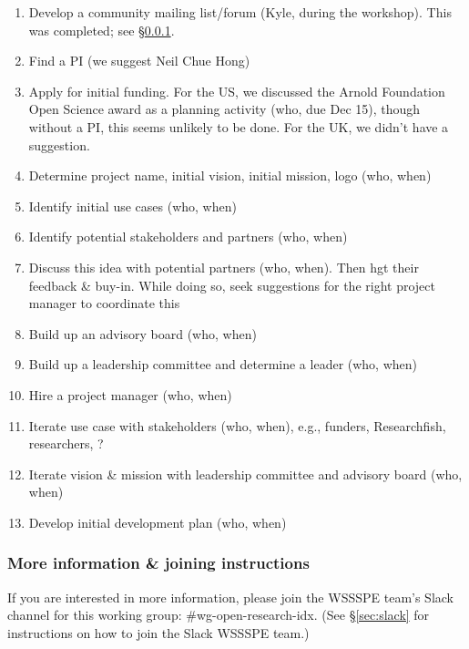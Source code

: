 \begin{enumerate}
\item Develop a community mailing list/forum (Kyle, during the workshop).  This was completed; see \S\ref{sec:wg-open-research-index-list}.

\item Find a PI (we suggest Neil Chue Hong)

\item Apply for initial funding. For the US, we discussed the Arnold Foundation Open Science award as a planning activity (who, due Dec 15), though without a PI, this seems unlikely to be done.
For the UK, we didn't have a suggestion.

\item Determine project name, initial vision, initial mission, logo (who, when)

\item Identify initial use cases (who, when)

\item Identify potential stakeholders and partners (who, when)

\item Discuss this idea with potential partners (who, when).
Then hgt their feedback \& buy-in.
While doing so, seek suggestions for the right project manager to coordinate this

\item Build up an advisory board (who, when)

\item Build up a leadership committee and determine a leader (who, when)

\item Hire a project manager (who, when)

\item Iterate use case with stakeholders (who, when),
e.g., funders, Researchfish, researchers, ?

\item Iterate vision \& mission with leadership committee and advisory board (who, when)

\item Develop initial development plan (who, when)

\end{enumerate}


\subsubsection{More information \& joining instructions}\label{sec:wg-open-research-index-list}

If you are interested in more information, please join the WSSSPE team's Slack channel for this working group: \#wg-open-research-idx.  (See \S\ref{sec:slack} for instructions on how to join the Slack WSSSPE team.)
